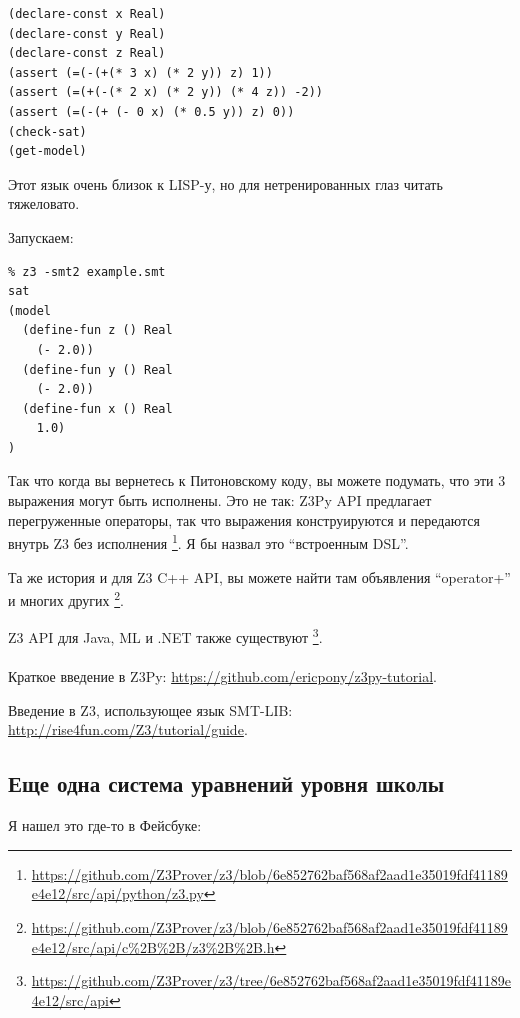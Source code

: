 \begin{lstlisting}
(declare-const x Real)
(declare-const y Real)
(declare-const z Real)
(assert (=(-(+(* 3 x) (* 2 y)) z) 1))
(assert (=(+(-(* 2 x) (* 2 y)) (* 4 z)) -2))
(assert (=(-(+ (- 0 x) (* 0.5 y)) z) 0))
(check-sat)
(get-model)
\end{lstlisting}

Этот язык очень близок к LISP-у, но для нетренированных глаз читать тяжеловато.

Запускаем:

\begin{lstlisting}
% z3 -smt2 example.smt
sat
(model
  (define-fun z () Real
    (- 2.0))
  (define-fun y () Real
    (- 2.0))
  (define-fun x () Real
    1.0)
)
\end{lstlisting}

Так что когда вы вернетесь к Питоновскому коду, вы можете подумать, что эти 3 выражения могут быть исполнены.
Это не так: Z3Py API предлагает перегруженные операторы, так что выражения конструируются и передаются внутрь Z3 без
исполнения
\footnote{\url{https://github.com/Z3Prover/z3/blob/6e852762baf568af2aad1e35019fdf41189e4e12/src/api/python/z3.py}}.
Я бы назвал это ``встроенным \ac{DSL}''.

Та же история и для Z3 C++ API, вы можете найти там объявления ``operator+'' и многих других
\footnote{\url{https://github.com/Z3Prover/z3/blob/6e852762baf568af2aad1e35019fdf41189e4e12/src/api/c\%2B\%2B/z3\%2B\%2B.h}}.

Z3 \ac{API} для Java, ML и .NET также существуют
\footnote{\url{https://github.com/Z3Prover/z3/tree/6e852762baf568af2aad1e35019fdf41189e4e12/src/api}}.\\
\\
Краткое введение в Z3Py: \url{https://github.com/ericpony/z3py-tutorial}.

Введение в Z3, использующее язык SMT-LIB: \url{http://rise4fun.com/Z3/tutorial/guide}.

\subsection{Еще одна система уравнений уровня школы}
\label{eq2_SMT}

Я нашел это где-то в Фейсбуке:

